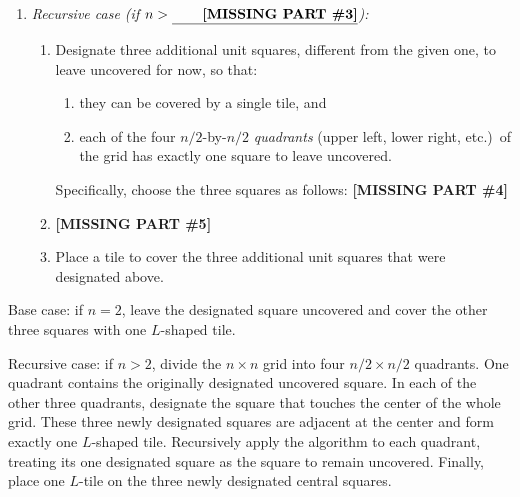 \documentclass[11pt,addpoints,answers]{exam}
\theoremstyle{plain}            %
\theoremstyle{definition}       %
\theoremstyle{remark}           %
\begin{document}
\begin{questions}
\begin{parts}
\begin{enumerate}
            \textbf{[MISSING PART \#2]}

            \vspace{5\baselineskip} %
            
            \item \emph{Recursive case (if $n>\textnormal{\underline{\hspace{0.3in}\textbf{[MISSING PART \#3]}}}$):}
              \begin{enumerate}[label=\textbullet]
              \item Designate three additional unit squares, different from the given one, to leave uncovered for now, so that:\label{step:three-squares}
                \begin{enumerate}
                \item they can be covered by a single tile, and
                \item each of the four $n/2$-by-$n/2$ \emph{quadrants} (upper left, lower right, etc.)\ of the grid has exactly one square to leave uncovered.
                \end{enumerate}
                
                Specifically, choose the three squares as follows: \textbf{[MISSING PART \#4]}
                
                \vspace{3\baselineskip} %
                
              \item \textbf{[MISSING PART \#5]}
              
                \vspace{3\baselineskip} %
              \item Place a tile to cover the three additional unit squares that were designated above.
              \end{enumerate}
        \end{enumerate}

    \begin{solution}
Base case: if \(n=2\), leave the designated square uncovered and cover the other three squares with one \(L\)-shaped tile.

Recursive case: if \(n>2\), divide the \(n\times n\) grid into four \(n/2\times n/2\) quadrants. One quadrant contains the originally designated uncovered square. In each of the other three quadrants, designate the square that touches the center of the whole grid. These three newly designated squares are adjacent at the center and form exactly one \(L\)-shaped tile. Recursively apply the algorithm to each quadrant, treating its one designated square as the square to remain uncovered. Finally, place one \(L\)-tile on the three newly designated central squares.
\end{solution}
    

\end{parts}
\end{questions}
\end{document}
